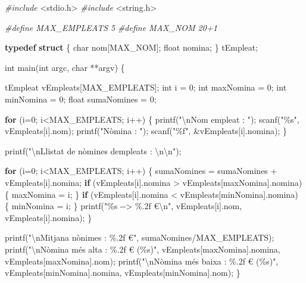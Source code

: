 \documentclass[]{book}
\newenvironment{Shaded}{\begin{snugshade}}{\end{snugshade}}
\newcommand{\ControlFlowTok}[1]{\textcolor[rgb]{0.13,0.29,0.53}{\textbf{#1}}}
\newcommand{\DataTypeTok}[1]{\textcolor[rgb]{0.13,0.29,0.53}{#1}}
\newcommand{\DecValTok}[1]{\textcolor[rgb]{0.00,0.00,0.81}{#1}}
\newcommand{\ImportTok}[1]{#1}
\newcommand{\KeywordTok}[1]{\textcolor[rgb]{0.13,0.29,0.53}{\textbf{#1}}}
\newcommand{\NormalTok}[1]{#1}
\newcommand{\PreprocessorTok}[1]{\textcolor[rgb]{0.56,0.35,0.01}{\textit{#1}}}
\newcommand{\SpecialCharTok}[1]{\textcolor[rgb]{0.00,0.00,0.00}{#1}}
\newcommand{\StringTok}[1]{\textcolor[rgb]{0.31,0.60,0.02}{#1}}
\begin{document}
\begin{Shaded}
\begin{Highlighting}[]
\PreprocessorTok{\#include }\ImportTok{\textless{}stdio.h\textgreater{}}
\PreprocessorTok{\#include }\ImportTok{\textless{}string.h\textgreater{}}

\PreprocessorTok{\#define MAX\_EMPLEATS 5}
\PreprocessorTok{\#define MAX\_NOM 20+1}

\KeywordTok{typedef} \KeywordTok{struct}\NormalTok{ \{}
   \DataTypeTok{char}\NormalTok{ nom[MAX\_NOM];}
   \DataTypeTok{float}\NormalTok{ nomina;}
\NormalTok{\} tEmpleat;}

\DataTypeTok{int}\NormalTok{ main(}\DataTypeTok{int}\NormalTok{ argc, }\DataTypeTok{char}\NormalTok{ **argv) \{}

\NormalTok{   tEmpleat vEmpleats[MAX\_EMPLEATS];}
   \DataTypeTok{int}\NormalTok{ i = }\DecValTok{0}\NormalTok{;}
   \DataTypeTok{int}\NormalTok{ maxNomina = }\DecValTok{0}\NormalTok{;}
   \DataTypeTok{int}\NormalTok{ minNomina = }\DecValTok{0}\NormalTok{;}
   \DataTypeTok{float}\NormalTok{ sumaNomines = }\DecValTok{0}\NormalTok{;}

   \ControlFlowTok{for}\NormalTok{ (i=}\DecValTok{0}\NormalTok{; i\textless{}MAX\_EMPLEATS; i++) \{}
\NormalTok{      printf(}\StringTok{"}\SpecialCharTok{\textbackslash{}n}\StringTok{Nom empleat : "}\NormalTok{);}
\NormalTok{      scanf(}\StringTok{"\%s"}\NormalTok{, vEmpleats[i].nom);}
\NormalTok{      printf(}\StringTok{"Nòmina : "}\NormalTok{);}
\NormalTok{      scanf(}\StringTok{"\%f"}\NormalTok{, \&vEmpleats[i].nomina);}
\NormalTok{   \}}

\NormalTok{   printf(}\StringTok{"}\SpecialCharTok{\textbackslash{}n}\StringTok{Llistat de nòmines d\textquotesingle{}empleats : }\SpecialCharTok{\textbackslash{}n\textbackslash{}n}\StringTok{"}\NormalTok{);}

   \ControlFlowTok{for}\NormalTok{ (i=}\DecValTok{0}\NormalTok{; i\textless{}MAX\_EMPLEATS; i++) \{}
\NormalTok{      sumaNomines = sumaNomines + vEmpleats[i].nomina;}
      \ControlFlowTok{if}\NormalTok{ (vEmpleats[i].nomina \textgreater{} vEmpleats[maxNomina].nomina) \{}
\NormalTok{         maxNomina = i;}
\NormalTok{      \}}
      \ControlFlowTok{if}\NormalTok{ (vEmpleats[i].nomina \textless{} vEmpleats[minNomina].nomina) \{}
\NormalTok{         minNomina = i;}
\NormalTok{      \}}
\NormalTok{      printf(}\StringTok{"\%s {-}{-}\textgreater{} \%.2f €}\SpecialCharTok{\textbackslash{}n}\StringTok{"}\NormalTok{, vEmpleats[i].nom, vEmpleats[i].nomina);}
\NormalTok{   \}}

\NormalTok{   printf(}\StringTok{"}\SpecialCharTok{\textbackslash{}n}\StringTok{Mitjana nònimes : \%.2f €"}\NormalTok{, sumaNomines/MAX\_EMPLEATS);}
\NormalTok{   printf(}\StringTok{"}\SpecialCharTok{\textbackslash{}n}\StringTok{Nòmina més alta : \%.2f € (\%s)"}\NormalTok{, vEmpleats[maxNomina].nomina, vEmpleats[maxNomina].nom);}
\NormalTok{   printf(}\StringTok{"}\SpecialCharTok{\textbackslash{}n}\StringTok{Nòmina més baixa : \%.2f € (\%s)"}\NormalTok{, vEmpleats[minNomina].nomina, vEmpleats[minNomina].nom);}
\NormalTok{\}}
\end{Highlighting}
\end{Shaded}
\end{document}
